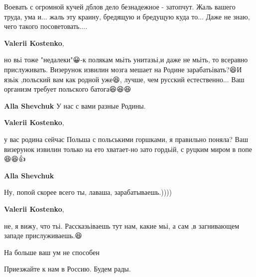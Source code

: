\begin{itemize}
Воевать с огромной кучей дблов дело безнадежное - затопчут. Жаль вашего труда,
ума и... жаль эту краину, бредящую и бредущую куда то... Даже не знаю, чего
такого посоветовать....🤔🤔🙄

\begin{itemize}
 
\textbf{Valerii Kostenko}, 

но вьі тоже "недалеки"😀-к полякам мьіть унитазьі,и даже не мьіть, то всеравно
прислуживать. Визерунок извилин мозга мешает на Родине зарабатьівать?😆И язьік
,польский вам как родной уже😆, лучше, чем русский естественно... Ваш организм
требует польского батога😆😆😆


 
\textbf{Alla Shevchuk}
У нас с вами разные Родины.

 
\textbf{Valerii Kostenko},

у вас родина сейчас Польша с польськими горшками, я правильно поняла? Ваш
визерунок извилин только на ето хватает-но зато гордьій, с руцким миром в
попе😆😆👍


 
\textbf{Alla Shevchuk}

Ну, попой скорее всего ты, лаваша, зарабатываешь.))))

 
\textbf{Valerii Kostenko},

не, я вижу, что тьі. Рассказьіваешь тут нам, какие мьі, а сам ,в загнивающем
западе прислуживаешь.😆

На больше ваш ум не способен

\end{itemize}

 
Приезжайте к нам в Россию. Будем рады.


\end{itemize}

